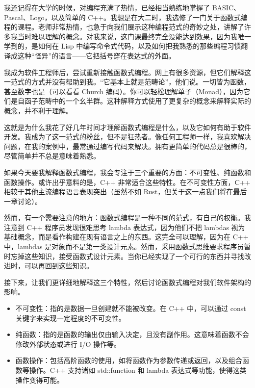 
我还记得在大学的时候，对编程充满了热情，已经相当熟练地掌握了 BASIC、Pascal、Logo，以及简单的 C++。我想是在大二时，我选修了一门关于函数式编程的课程。老师非常热情，也急于向我们展示这种编程范式的奇妙之处，讲解了许多我当时难以理解的概念。对我来说，这门课最终完全没能达到效果，因为我唯一学到的，是如何在 Lisp 中编写命令式代码，以及如何把我熟悉的那些编程习惯翻译成这种“怪异”的语言——它把括号穿在表达式的外面。

我成为软件工程师后，尝试重新接触函数式编程。网上有很多资源，但它们解释这一范式的方式并没有帮助到我。“它基本上就是范畴论”，他们说。一切皆为函数，甚至数字也是（可以看看 Church 编码）。你可以轻松理解单子（Monad），因为它们是自函子范畴中的一个幺半群。这种解释方式使用了更复杂的概念来解释实际的概念，并不利于理解。

这就是为什么我花了好几年时间才理解函数式编程是什么，以及它如何有助于软件开发。我成为了这一范式的粉丝，但不是狂热者。像任何工程师一样，我喜欢解决问题，在我的案例中，最常通过编写代码来解决。拥有更简单的代码总是很棒的，尽管简单并不总是意味着熟悉。

如果今天要我解释函数式编程，我会专注于三个重要的方面：不可变性、纯函数和函数操作。或许出乎意料的是，C++ 非常适合这些特性。在不可变性方面，C++ 相较于其他主流编程语言表现突出（虽然不如 Rust，但关于这一点我们将在最后一章讨论）。

然而，有一个需要注意的地方：函数式编程是一种不同的范式，有自己的权衡。我注意到 C++ 程序员发现很难思考 lambda 表达式，因为他们不把 lambdas 视为基础概念，而是看作构建在现有语言之上的东西。这完全可以理解，因为在 C++ 中，lambdas 是对象而不是第一类设计元素。然而，采用函数式思维要求程序员暂时忘掉这些知识，接受函数式设计元素。当你已经实现了一个可行的东西并寻找改进时，可以再回到这些知识。

接下来，让我们更详细地解释这三个特性，然后讨论函数式编程对我们软件架构的影响。 

\begin{itemize}
\item 
不可变性：指的是数据一旦创建就不能被改变。在 C++ 中，可以通过 const 关键字来实现一定程度的不可变性。

\item 
纯函数：指的是函数的输出仅由输入决定，且没有副作用。这意味着函数不会修改外部状态或进行 I/O 操作等。

\item 
函数操作：包括高阶函数的使用，如将函数作为参数传递或返回，以及组合函数等操作。C++ 支持诸如 std::function 和 lambda 表达式等功能，使得这类操作变得可能。 
\end{itemize}

